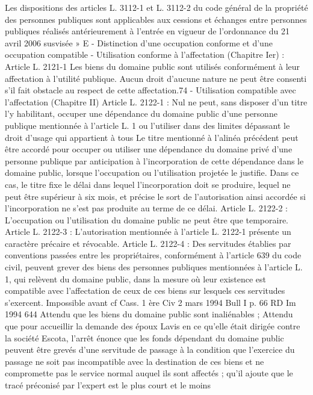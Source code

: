 \documentclass[11pt,a4paper]{report}
\begin{document}
Les dispositions des articles L. 3112-1 et L. 3112-2 du code général de la propriété des personnes publiques sont
applicables aux cessions et échanges entre personnes publiques réalisés antérieurement à l'entrée en vigueur de
l'ordonnance du 21 avril 2006 susvisée »
E - Distinction d’une occupation conforme et d’une occupation compatible
- Utilisation conforme à l'affectation (Chapitre Ier) : Article L. 2121-1
Les biens du domaine public sont utilisés conformément à leur affectation à l'utilité publique.
Aucun droit d'aucune nature ne peut être consenti s'il fait obstacle au respect de cette affectation.74
- Utilisation compatible avec l'affectation (Chapitre II)
Article L. 2122-1 : Nul ne peut, sans disposer d'un titre l'y habilitant, occuper une dépendance du domaine
public d'une personne publique mentionnée à l'article L. 1 ou l'utiliser dans des limites dépassant le droit
d'usage qui appartient à tous
Le titre mentionné à l'alinéa précédent peut être accordé pour occuper ou utiliser une dépendance du domaine
privé d'une personne publique par anticipation à l'incorporation de cette dépendance dans le domaine public,
lorsque l'occupation ou l'utilisation projetée le justifie.
Dans ce cas, le titre fixe le délai dans lequel l'incorporation doit se produire, lequel ne peut être supérieur à six
mois, et précise le sort de l'autorisation ainsi accordée si l'incorporation ne s'est pas produite au terme de ce
délai.
Article L. 2122-2 : L'occupation ou l'utilisation du domaine public ne peut être que temporaire.
Article L. 2122-3 : L'autorisation mentionnée à l'article L. 2122-1 présente un caractère précaire et révocable.
Article L. 2122-4 : Des servitudes établies par conventions passées entre les propriétaires, conformément à
l'article 639 du code civil, peuvent grever des biens des personnes publiques mentionnées à l'article L. 1, qui
relèvent du domaine public, dans la mesure où leur existence est compatible avec l'affectation de ceux de ces
biens sur lesquels ces servitudes s'exercent.
Impossible avant cf Cass. 1 ère Civ 2 mars 1994 Bull I  p. 66 RD Im 1994 644
Attendu que les biens du domaine public sont inaliénables ;
Attendu que pour accueillir la demande des époux Lavis en ce qu'elle était dirigée contre la société Escota, l'arrêt
énonce que les fonds dépendant du domaine public peuvent être grevés d'une servitude de passage à la condition
que l'exercice du passage ne soit pas incompatible avec la destination de ces biens et ne compromette pas le
service normal auquel ils sont affectés ; qu'il ajoute que le tracé préconisé par l'expert est le plus court et le moins
\end{document}
